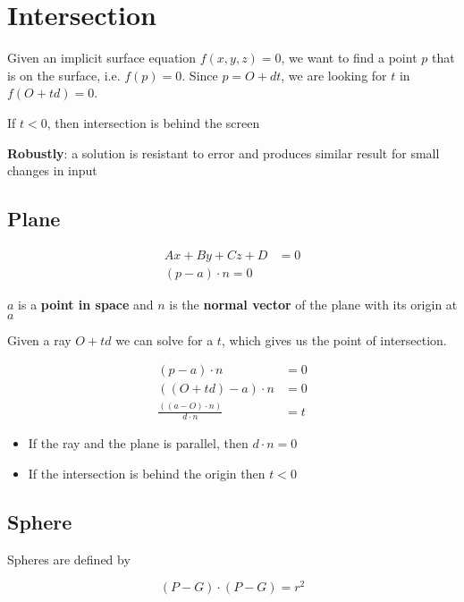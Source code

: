 \chapter{Intersection}

Given an implicit surface equation $ f\left( x, y, z \right) = 0 $, we
want to find a point $ p $ that is on the surface,
i.e. $ f\left( p \right) = 0 $. Since $ p = O + dt $, we are looking for
$ t $ in $ f\left( O + td \right) = 0 $.

If $ t < 0 $, then intersection is behind the screen

\textbf{Robustly}: a solution is resistant to error and produces similar
result for small changes in input

\section{Plane}

  \begin{align}
    Ax + By + Cz + D &= 0 \\
    \left( p - a \right) \cdot n = 0
  \end{align}

  $ a $ is a \textbf{point in space} and $ n $ is the \textbf{normal vector}
  of the plane with its origin at $ a $

  Given a ray $ O + td $ we can solve for a $ t $, which gives us the
  point of intersection.

  \begin{align*}
    \left( p - a \right) \cdot n &= 0 \\
    \left( \left( O + td \right) - a \right) \cdot n &= 0 \\
    \frac{\left( \left( a - O \right) \cdot n \right)}{d \cdot n} &= t
  \end{align*}

  \begin{itemize}
    \item If the ray and the plane is parallel, then $ d \cdot n = 0 $
    \item If the intersection is behind the origin then $ t < 0 $
  \end{itemize}

\section{Sphere}

  Spheres are defined by

  \begin{equation}
    \left( P - G \right) \cdot \left( P - G \right) = r^{2}
  \end{equation}

